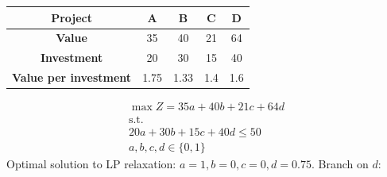 \documentclass[10pt]{article}
\begin{document}
\begin{center}
    \begin{tabular}{|c|c|c|c|c|}
        \hline 
        \textbf{Project} & \textbf{A} & \textbf{B} & \textbf{C} & \textbf{D}\\\hline 
        \textbf{Value} & 35 & 40 & 21 & 64 \\\hline 
        \textbf{Investment} & 20 & 30 & 15 & 40 \\\hline 
        \textbf{Value per investment} & 1.75 & 1.33 & 1.4 & 1.6 \\\hline 
    \end{tabular}
\end{center}
\begin{gather*}
    \max Z = 35a + 40b + 21c + 64d\\
    \text{s.t.}\\
    20a + 30b + 15c + 40d \le 50 \\
    a, b, c, d \in \{0, 1\}
\end{gather*}
Optimal solution to LP relaxation: $a = 1, b = 0, c = 0, d = 0.75 $. Branch on $ d $:
\end{document}
